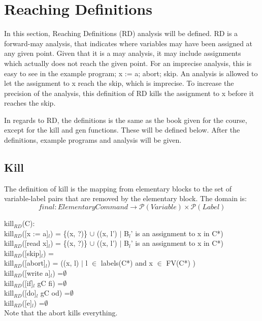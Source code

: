 \section{Reaching Definitions}

In this section, Reaching Definitions (RD) analysis will be defined.
RD is a forward-may analysis, that indicates where variables may have
been assigned at any given point. Given that it is a may analysis,
it may include assignments which actually does not reach the given point.
For an imprecise analysis, this is easy to see in the example program;
x := a; abort; skip. An analysis is allowed to let the assignment to x
reach the skip, which is imprecise. To increase the precision of the analysis,
this definition of RD kills the assignment to x before it reaches the skip.

In regards to RD, the definitions is the same as the book given for the course,
except for the kill and gen functions. These will be defined below.
After the definitions, example programs and analysis will be given.

\subsection{Kill}

The definition of kill is the mapping from elementary blocks to the set of variable-label pairs
that are removed by the elementary block. The domain is:
\[final \colon Elementary Command \to \mathcal{P}(Variable)\times\mathcal{P}(Label)\]

\docpar
kill$_{RD}$(C):\\
kill$_{RD}$([x := a]$_l$)           = \{(x, ?)\} $\cup$ ((x, l') $\vert$ B$_l$' is an assignment to x in C*)\\
kill$_{RD}$([read x]$_l$)           = \{(x, ?)\} $\cup$ ((x, l') $\vert$ B$_l$' is an assignment to x in C*)\\
kill$_{RD}$([skip]$_l$)             =\\
kill$_{RD}$([abort]$_l$) 			= ((x, l) $\vert$ l $\in$ labels(C*) and x $\in$ FV(C*) )\\
kill$_{RD}$([write a]$_l$)          =$\emptyset$\\
kill$_{RD}$([if]$_l$ gC fi)         =$\emptyset$\\
kill$_{RD}$([do]$_l$ gC od)         =$\emptyset$\\
kill$_{RD}$([e]$_l$)                =$\emptyset$\\

Note that the abort kills everything.

